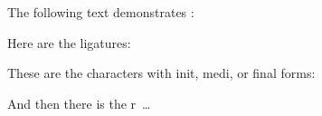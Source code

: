 \documentclass{article}
\begin{document}
\noindent
The following text demonstrates :
\bigskip



\noindent
Here are the ligatures:\par
{}

\noindent
These are the characters with init, medi, or final forms:\par
{}

\noindent
And then there is the r~\ldots\par
{}
\end{document}
